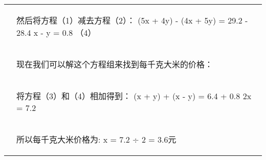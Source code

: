 \documentclass{article}
\begin{document}
\begin{table}[h!]
\begin{tabular}{ c|l }
             & \begin{CJK*}{UTF8}{gbsn} 然后将方程（1）减去方程（2）： (5x + 4y) - (4x + 5y) = 29.2 - 28.4 x - y = 0.8 （4）\end{CJK*}\\
             & \begin{CJK*}{UTF8}{gbsn} 现在我们可以解这个方程组来找到每千克大米的价格： \end{CJK*}\\
             & \begin{CJK*}{UTF8}{gbsn} 将方程（3）和（4）相加得到： (x + y) + (x - y) = 6.4 + 0.8 2x = 7.2 \end{CJK*}\\
             & \begin{CJK*}{UTF8}{gbsn} 所以每千克大米价格为: x = 7.2 ÷ 2 = 3.6元 \end{CJK*}\\
\hline
\end{tabular}
\end{table}
\end{document}
